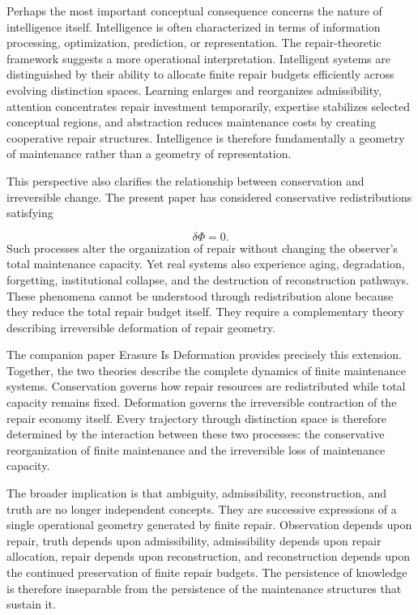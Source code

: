 \documentclass[12pt,oneside]{article}
\theoremstyle{plain}
\theoremstyle{definition}
\theoremstyle{remark}
\begin{document}
Perhaps the most important conceptual consequence concerns the nature of intelligence itself. Intelligence is often characterized in terms of information processing, optimization, prediction, or representation. The repair-theoretic framework suggests a more operational interpretation. Intelligent systems are distinguished by their ability to allocate finite repair budgets efficiently across evolving distinction spaces. Learning enlarges and reorganizes admissibility, attention concentrates repair investment temporarily, expertise stabilizes selected conceptual regions, and abstraction reduces maintenance costs by creating cooperative repair structures. Intelligence is therefore fundamentally a geometry of maintenance rather than a geometry of representation.

This perspective also clarifies the relationship between conservation and irreversible change. The present paper has considered conservative redistributions satisfying

\[
\delta\Phi=0.
\]
Such processes alter the organization of repair without changing the observer's total maintenance capacity. Yet real systems also experience aging, degradation, forgetting, institutional collapse, and the destruction of reconstruction pathways. These phenomena cannot be understood through redistribution alone because they reduce the total repair budget itself. They require a complementary theory describing irreversible deformation of repair geometry.

The companion paper Erasure Is Deformation provides precisely this extension. Together, the two theories describe the complete dynamics of finite maintenance systems. Conservation governs how repair resources are redistributed while total capacity remains fixed. Deformation governs the irreversible contraction of the repair economy itself. Every trajectory through distinction space is therefore determined by the interaction between these two processes: the conservative reorganization of finite maintenance and the irreversible loss of maintenance capacity.

The broader implication is that ambiguity, admissibility, reconstruction, and truth are no longer independent concepts. They are successive expressions of a single operational geometry generated by finite repair. Observation depends upon repair, truth depends upon admissibility, admissibility depends upon repair allocation, repair depends upon reconstruction, and reconstruction depends upon the continued preservation of finite repair budgets. The persistence of knowledge is therefore inseparable from the persistence of the maintenance structures that sustain it.
\end{document}

